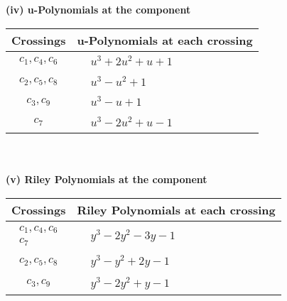 \documentclass[1p]{elsarticle_modified}
\theoremstyle{definition}
\begin{document}
\newpage\renewcommand{\arraystretch}{1}
\flushleft \textbf{(iv) u-Polynomials at the component}\newline \\
\begin{tabular}{m{50pt}|m{274pt}}
Crossings & \hspace{64pt}u-Polynomials at each crossing \\
\hline $$\begin{aligned}c_{1},c_{4},c_{6}\end{aligned}$$&$\begin{aligned}
&u^3+2 u^2+u+1
\end{aligned}$\\
\hline $$\begin{aligned}c_{2},c_{5},c_{8}\end{aligned}$$&$\begin{aligned}
&u^3- u^2+1
\end{aligned}$\\
\hline $$\begin{aligned}c_{3},c_{9}\end{aligned}$$&$\begin{aligned}
&u^3- u+1
\end{aligned}$\\
\hline $$\begin{aligned}c_{7}\end{aligned}$$&$\begin{aligned}
&u^3-2 u^2+u-1
\end{aligned}$\\
\hline
\end{tabular}\\~\\
\newpage\renewcommand{\arraystretch}{1}
\flushleft \textbf{(v) Riley Polynomials at the component}\newline \\
\begin{tabular}{m{50pt}|m{274pt}}
Crossings & \hspace{64pt}Riley Polynomials at each crossing \\
\hline $$\begin{aligned}c_{1},c_{4},c_{6}\\c_{7}\end{aligned}$$&$\begin{aligned}
&y^3-2 y^2-3 y-1
\end{aligned}$\\
\hline $$\begin{aligned}c_{2},c_{5},c_{8}\end{aligned}$$&$\begin{aligned}
&y^3- y^2+2 y-1
\end{aligned}$\\
\hline $$\begin{aligned}c_{3},c_{9}\end{aligned}$$&$\begin{aligned}
&y^3-2 y^2+y-1
\end{aligned}$\\
\hline
\end{tabular}\\~\\
\end{document}
